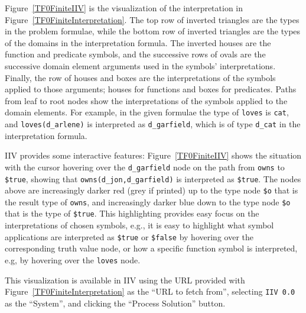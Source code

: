 \documentclass[letterpaper]{article}
\newcommand{\smalltt}[1]{\small \texttt{#1}}
\begin{document}
{Figure~\ref{TF0FiniteIIV} is the visualization of the interpretation in 
Figure~\ref{TF0FiniteInterpretation}.
The top row of inverted triangles are the types in the problem formulae,
while the bottom row of inverted triangles are the types of the domains in the interpretation
formula.
The inverted houses are the function and predicate symbols, and the successive rows of ovals are 
the successive domain element arguments used in the symbols' interpretations.
Finally, the row of houses and boxes are the interpretations of the symbols applied to those
arguments; houses for functions and boxes for predicates.
Paths from leaf to root nodes show the interpretations of the symbols applied to the 
domain elements.
For example, in the given formulae the type of {\smalltt{loves}} is {\smalltt{cat}},
and {\smalltt{loves(d\_arlene)}} is interpreted as {\smalltt{d\_garfield}}, which is of type
{\smalltt{d\_cat}} in the interpretation formula.

IIV provides some interactive features: Figure~\ref{TF0FiniteIIV} shows the situation with the 
cursor hovering over the {\smalltt{d\_garfield}} node on the path from {\smalltt{owns}} to 
{\smalltt{\$true}}, showing that {\smalltt{owns(d\_jon,d\_garfield)}} is interpreted as 
{\smalltt{\$true}}.
The nodes above are increasingly darker red (grey if printed) up to the type node {\smalltt{\$o}} 
that is the result type of {\smalltt{owns}}, and increasingly darker blue down to the type node 
{\smalltt{\$o}} that is the type of {\smalltt{\$true}}.
This highlighting provides easy focus on the interpretations of chosen symbols, e.g., it is easy
to highlight what symbol applications are interpreted as {\smalltt{\$true}} or {\smalltt{\$false}}
by hovering over the corresponding truth value node, or how a specific function symbol is 
interpreted, e.g, by hovering over the {\smalltt{loves}} node.

This visualization is available in IIV using the URL provided with 
Figure~\ref{TF0FiniteInterpretation} as the ``URL to fetch from'',
selecting {\tt IIV 0.0} as the ``System'', and clicking the ``Process Solution'' button.

}
\end{document}
